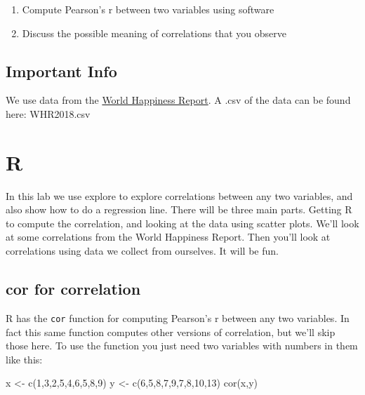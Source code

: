 \documentclass[
]{book}
\newenvironment{Shaded}{\begin{snugshade}}{\end{snugshade}}
\newcommand{\DecValTok}[1]{\textcolor[rgb]{0.00,0.00,0.81}{#1}}
\newcommand{\FunctionTok}[1]{\textcolor[rgb]{0.00,0.00,0.00}{#1}}
\newcommand{\NormalTok}[1]{#1}
\newcommand{\OtherTok}[1]{\textcolor[rgb]{0.56,0.35,0.01}{#1}}
\providecommand{\tightlist}{%
  \setlength{\itemsep}{0pt}\setlength{\parskip}{0pt}}
\begin{document}
\begin{enumerate}
\def\labelenumi{\arabic{enumi}.}
\tightlist
\item
  Compute Pearson's r between two variables using software
\item
  Discuss the possible meaning of correlations that you observe
\end{enumerate}

\hypertarget{important-info-2}{%
\subsection{Important Info}\label{important-info-2}}

We use data from the \href{http://worldhappiness.report}{World Happiness Report}. A .csv of the data can be found here: WHR2018.csv

\hypertarget{r-3}{%
\section{R}\label{r-3}}

In this lab we use explore to explore correlations between any two variables, and also show how to do a regression line. There will be three main parts. Getting R to compute the correlation, and looking at the data using scatter plots. We'll look at some correlations from the World Happiness Report. Then you'll look at correlations using data we collect from ourselves. It will be fun.

\hypertarget{cor-for-correlation}{%
\subsection{cor for correlation}\label{cor-for-correlation}}

R has the \texttt{cor} function for computing Pearson's r between any two variables. In fact this same function computes other versions of correlation, but we'll skip those here. To use the function you just need two variables with numbers in them like this:

\begin{Shaded}
\begin{Highlighting}[]
\NormalTok{x  }\OtherTok{\textless{}{-}} \FunctionTok{c}\NormalTok{(}\DecValTok{1}\NormalTok{,}\DecValTok{3}\NormalTok{,}\DecValTok{2}\NormalTok{,}\DecValTok{5}\NormalTok{,}\DecValTok{4}\NormalTok{,}\DecValTok{6}\NormalTok{,}\DecValTok{5}\NormalTok{,}\DecValTok{8}\NormalTok{,}\DecValTok{9}\NormalTok{)}
\NormalTok{y  }\OtherTok{\textless{}{-}} \FunctionTok{c}\NormalTok{(}\DecValTok{6}\NormalTok{,}\DecValTok{5}\NormalTok{,}\DecValTok{8}\NormalTok{,}\DecValTok{7}\NormalTok{,}\DecValTok{9}\NormalTok{,}\DecValTok{7}\NormalTok{,}\DecValTok{8}\NormalTok{,}\DecValTok{10}\NormalTok{,}\DecValTok{13}\NormalTok{)}
\FunctionTok{cor}\NormalTok{(x,y)}
\end{Highlighting}
\end{Shaded}
\end{document}
